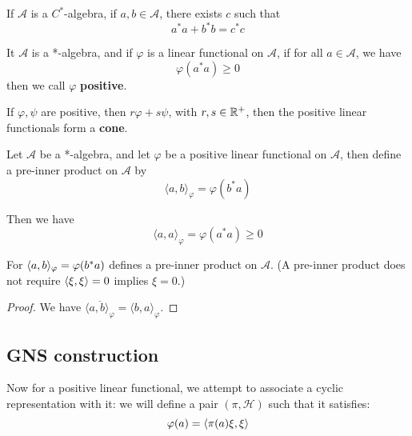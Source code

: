 \begin{proposition}
    If $\mathcal{A}$ is a $C^*$-algebra, if $a,b\in\mathcal{A}$, there exists $c$ such that
    \begin{equation*}
        a^*a+b^*b=c^*c
    \end{equation*}
\end{proposition}

\begin{definition}
    It $\mathcal{A}$ is a *-algebra, and if $\varphi$ is a linear functional on $\mathcal{A}$, if for all $a\in\mathcal{A}$, we have
    \begin{equation*}
        \varphi(a^*a)\geq 0
    \end{equation*}
    then we call $\varphi$ \textbf{positive}.
\end{definition}
\begin{proposition}
    If $\varphi, \psi$ are positive, then $r\varphi+s\psi$, with $r,s\in\mathbb{R}^+$, then the positive linear functionals form a \textbf{cone}.
\end{proposition}

Let $\mathcal{A}$ be a *-algebra, and let $\varphi$ be a positive linear functional on $\mathcal{A}$, then define a pre-inner product on $\mathcal{A}$ by
\begin{equation*}
    \langle a, b\rangle_\varphi=\varphi(b^*a)
\end{equation*}

Then we have
\begin{equation*}
    \langle a, a\rangle_\varphi=\varphi(a^*a)\geq 0
\end{equation*}

\begin{proposition}
    For $\langle a,b\rangle_\varphi=\varphi(b^*a)$ defines a pre-inner product on $\mathcal{A}$. (A pre-inner product does not require $\langle \xi, \xi\rangle=0$ implies $\xi=0$.)
\end{proposition}
\begin{proof}
    We have $\overline{\langle a,b\rangle_\varphi}=\langle b, a\rangle_\varphi$.
\end{proof}
\subsection{GNS construction}
Now for a positive linear functional, we attempt to associate a cyclic representation with it: we will define a pair $(\pi, \mathcal{H})$ such that it satisfies:
\begin{equation*}
    \varphi(a)=\langle \pi(a)\xi, \xi\rangle
\end{equation*}

